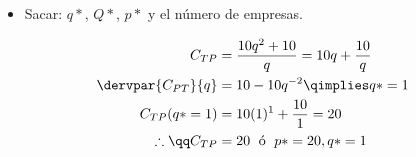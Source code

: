 \begin{itemize}
\begin{itemize}
\begin{center}
                   \begin{itemize}
                       \item Sacar: $q*$, $Q*$, $p*$ y el número de empresas.  
                   \end{itemize}
                   \begin{align*}
                       C_{TP} &= \frac{10q^2+10}{q} = 10q +\frac{10}{q} \\
                       \dervpar{C_{PT}}{q} &= 10 - 10q^{-2} \qimplies q* = 1 \\  
                       C_{TP}(q*=1) &= 10(1)^1 + \frac{10}{1} = 20 \\ 
                       \therefore \qq C_{TP}&=20 \; \text{ ó }\; p*=20, q*=1 \\   
                   \end{align*}
                \end{center}
        \end{itemize}
\end{itemize}
